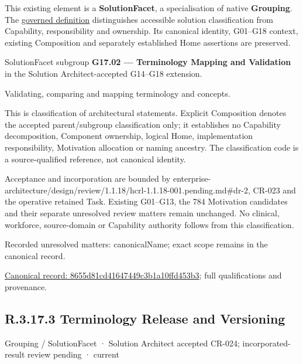 This existing element is a \textbf{SolutionFacet}, a specialisation of native
\textbf{Grouping}. The \href{\detokenize{../../../../../../../governance/continuum-representation.md#solutionfacet-classification--1119-candidate}}{governed definition}
distinguishes accessible solution classification from Capability, responsibility
and ownership. Its canonical identity, G01–G18 context, existing Composition
and separately established Home assertions are preserved.



SolutionFacet subgroup \textbf{G17.02 — Terminology Mapping and Validation} in the Solution Architect-accepted G14–G18 extension.



Validating, comparing and mapping terminology and concepts.



This is classification of architectural statements. Explicit Composition denotes the accepted parent/subgroup classification only; it establishes no Capability decomposition, Component ownership, logical Home, implementation responsibility, Motivation allocation or naming ancestry. The classification code is a source-qualified reference, not canonical identity.



Acceptance and incorporation are bounded by enterprise-architecture/design/review/1.1.18/hcrl-1.1.18-001.pending.md\#dr-2, CR-023 and the operative retained Task. Existing G01–G13, the 784 Motivation candidates and their separate unresolved review matters remain unchanged. No clinical, workforce, source-domain or Capability authority follows from this classification.


{\small Recorded unresolved matters: canonicalName; exact scope remains in the canonical record.}\par
{\footnotesize \href{../../../../../../../continuum/grouping/8655d81cd41647449c3b1a10ffd453b3.md}{Canonical record: 8655d81cd41647449c3b1a10ffd453b3}; full qualifications and provenance.}\par
\subsection*{R.3.17.3 Terminology Release and Versioning}
\label{navigation:R.3.17.3}

\label{element:4e0bcac2a001411c8802b5df30e6bb38}
{\small Grouping / SolutionFacet · Solution Architect accepted CR-024; incorporated-result review pending · current}\par

